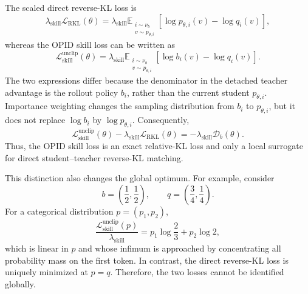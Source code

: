 \begin{remark}
\label{rem:not_direct_kl}
The scaled direct reverse-KL loss is
\begin{equation*}
 \lambda_{\mathrm{skill}}
 \mathcal L_{\mathrm{RKL}}(\theta)
 =
 \lambda_{\mathrm{skill}}
 \mathbb E_{\substack{i\sim\nu_b\\v\sim p_{\theta,i}}}
 \left[
   \log p_{\theta,i}(v)-\log q_i(v)
 \right],
\end{equation*}
whereas the OPID skill loss can be written as
\begin{equation*}
 \mathcal L_{\mathrm{skill}}^{\mathrm{unclip}}(\theta)
 =
 \lambda_{\mathrm{skill}}
 \mathbb E_{\substack{i\sim\nu_b\\v\sim p_{\theta,i}}}
 \left[
   \log b_i(v)-\log q_i(v)
 \right].
\end{equation*}
The two expressions differ because the denominator in the detached
teacher advantage is the rollout policy \(b_i\), rather than the current
student \(p_{\theta,i}\). Importance weighting changes the sampling
distribution from \(b_i\) to \(p_{\theta,i}\), but it does not replace
\(\log b_i\) by \(\log p_{\theta,i}\). Consequently,
\begin{equation*}
 \mathcal L_{\mathrm{skill}}^{\mathrm{unclip}}(\theta)
 -
 \lambda_{\mathrm{skill}}
 \mathcal L_{\mathrm{RKL}}(\theta)
 =
 -
 \lambda_{\mathrm{skill}}\mathcal D_b(\theta).
\end{equation*}
Thus, the OPID skill loss is an exact relative-KL loss and only a local
surrogate for direct student--teacher reverse-KL matching.

This distinction also changes the global optimum. For example, consider
\[
 b=\left(\frac12,\frac12\right),
 \qquad
 q=\left(\frac34,\frac14\right).
\]
For a categorical distribution \(p=(p_1,p_2)\),
\begin{equation*}
 \frac{
 \mathcal L_{\mathrm{skill}}^{\mathrm{unclip}}(p)
 }{
 \lambda_{\mathrm{skill}}
 }
 =
 p_1\log\frac{2}{3}
 +
 p_2\log 2,
\end{equation*}
which is linear in \(p\) and whose infimum is approached by concentrating
all probability mass on the first token. In contrast, the direct reverse-KL
loss is uniquely minimized at \(p=q\). Therefore, the two losses cannot be
identified globally.
\end{remark}


